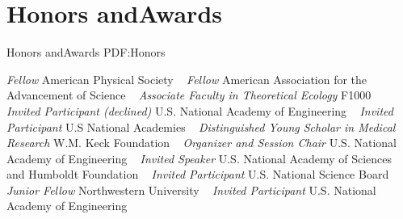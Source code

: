 \section
{Honors and\newline Awards}
{Honors and\newline Awards}
{PDF:Honors}

\textit{Fellow}
\newline
American Physical Society
\newline
~
\Gap
{}
\textit{Fellow}
\newline
American Association for the Advancement of Science
\newline
~
\Gap
{}
\textit{Associate Faculty in Theoretical Ecology}
\newline
F1000
\newline
~
\Gap
{}
\textit{Invited Participant (declined)}
\newline
U.S. National Academy of Engineering
\newline
~
\Gap
{}
\textit{Invited Participant}
\newline
U.S National Academies
\newline
~
\Gap
{}
\textit{Distinguished Young Scholar in Medical Research}
\newline
W.M. Keck Foundation 
\newline
~
\Gap
{}
\textit{Organizer and Session Chair}
\newline
U.S. National Academy of Engineering
\newline
~
\Gap
{}
\textit{Invited Speaker}
\newline
U.S. National Academy of Sciences and Humboldt Foundation
\newline
~
\Gap
{}
\textit{Invited Participant}
\newline
U.S. National Science Board
\newline
~
\Gap
{}
\textit{Junior Fellow}
\newline
Northwestern University
\newline
~
\Gap
{}
\textit{Invited Participant}
\newline
U.S. National Academy of Engineering
\newline
